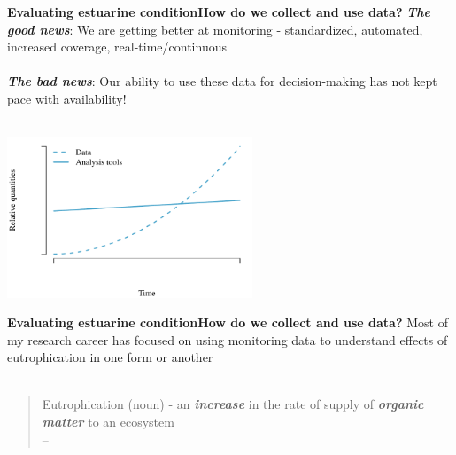 \documentclass[serif]{beamer}\usepackage[]{graphicx}\usepackage[]{color}
\newcommand{\emtxt}[1]{\textbf{\textit{#1}}}
\begin{document}
\begin{frame}{\textbf{Evaluating estuarine condition}}{\textbf{How do we collect and use data?}}
\onslide<+->
\emtxt{The good news}: We are getting better at monitoring - standardized, automated, increased coverage, real-time/continuous \\~\\
\emtxt{The bad news}: Our ability to use these data for decision-making has not kept pace with availability! \\~\\
\onslide<+->


{\centering \includegraphics[width=0.55\textwidth]{fig/theo-1} 

}



\end{frame}

\begin{frame}{\textbf{Evaluating estuarine condition}}{\textbf{How do we collect and use data?}}
Most of my research career has focused on using monitoring data to understand effects of eutrophication in one form or another \\~\\
\onslide<+->
\begin{quote}
Eutrophication (noun) - an \emtxt{increase} in the rate of supply of \emtxt{organic matter} to an ecosystem\\
\hfill -- \cite{Nixon95}
\end{quote}
\begin{center}
\end{center}
\vspace{-0.5cm}\hspace*{15pt}\\~\\
\end{frame}
\end{document}
